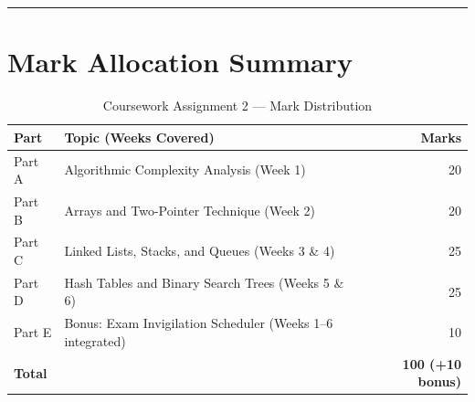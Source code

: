 \documentclass[11pt,a4paper]{article}
\begin{document}
\vspace{0.5cm}
\hrule
\vspace{0.4cm}

\section*{Mark Allocation Summary}
\begin{table}[h!]
    \centering
    \caption{Coursework Assignment 2 --- Mark Distribution}
    \vspace{0.2cm}
    \begin{tabular}{llr}
        \toprule
        \textbf{Part} & \textbf{Topic (Weeks Covered)} & \textbf{Marks} \\
        \midrule
        Part A & Algorithmic Complexity Analysis (Week 1)                    & 20 \\
        Part B & Arrays and Two-Pointer Technique (Week 2)                   & 20 \\
        Part C & Linked Lists, Stacks, and Queues (Weeks 3 \& 4)             & 25 \\
        Part D & Hash Tables and Binary Search Trees (Weeks 5 \& 6)          & 25 \\
        Part E & Bonus: Exam Invigilation Scheduler (Weeks 1--6 integrated)  & 10 \\
        \midrule
        \textbf{Total} & & \textbf{100 (+10 bonus)} \\
        \bottomrule
    \end{tabular}
\end{table}
\end{document}
